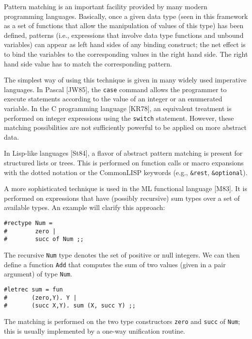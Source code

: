 \documentclass[a4paper,11pt]{article}
\begin{document}
Pattern matching is an important facility provided by many modern
programming languages. Basically, once a given data type (seen in
this framework as a set of functions that allow the manipulation of
values of this type) has been defined, patterns (i.e., expressions
that involve data type functions and unbound variables) can appear as
left hand sides of any binding construct; the net effect is to bind
the variables to the corresponding values in the right hand side. The
right hand side value has to match the corresponding pattern. 

The simplest way of using this technique is given in many widely used
imperative languages. In Pascal [JW85], the \texttt{case} command allows the
programmer to execute statements according to the value of an integer
or an enumerated variable. In the C programming language [KR78], an
equivalent treatment is performed on integer expressions using the
\texttt{switch} statement. However, these matching possibilities are not
sufficiently powerful to be applied on more abstract data.

In Lisp-like languages [St84], a flavor of abstract pattern matching is
present for structured lists or trees. This is performed on function
calls or macro expansions with the dotted notation or the CommonLISP
keywords (e.g., \texttt{\&rest}, \texttt{\&optional}).

A more sophisticated technique is used in the ML functional language
[M83].  It is performed on expressions that have (possibly recursive)
sum types over a set of available types. An example will clarify this
approach:
\begin{verbatim}
#rectype Num =
#        zero |
#        succ of Num ;;
\end{verbatim}
The recursive \texttt{Num} type denotes the set of positive or null
integers. We can then define a function \texttt{Add} that computes the
sum of two values (given in a pair argument) of type \texttt{Num}.
\begin{verbatim}
#letrec sum = fun
#       (zero,Y). Y |
#       (succ X,Y). sum (X, succ Y) ;;
\end{verbatim}
The matching is performed on the two type constructors \texttt{zero} and
\texttt{succ} of \texttt{Num}; this is usually implemented by a one-way
unification routine.
\end{document}
